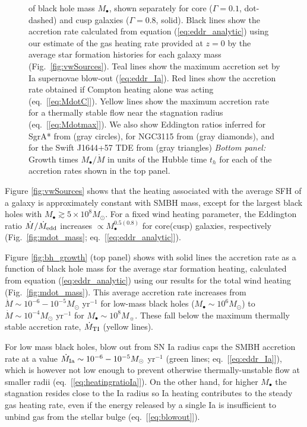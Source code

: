 \documentclass[usenatbib,fleqn]{mn2e}
\newcommand{\Mdot}{\dot{M}}
\newcommand{\Mbh}[1][]{M_{\bullet#1}}
\renewcommand{\th}{t_h}
\begin{document}
\begin{figure}
{  of black hole mass $M_{\bullet}$, shown separately for core
  ($\Gamma=0.1$, dot-dashed) and cusp galaxies ($\Gamma=0.8$,
  solid).  Black lines show the accretion rate calculated
  from equation (\ref{eq:eddr_analytic}) using our estimate of the gas
  heating rate provided at $z = 0$ by the average star formation
  histories for each galaxy mass (Fig.~\ref{fig:vwSources}).  Teal
  lines show the maximum accretion set by Ia supernovae blow-out
  (\ref{eq:eddr_Ia}).  Red lines show the accretion rate obtained
  if Compton heating alone was acting (eq.~[\ref{eq:MdotC}]).  Yellow
  lines show the maximum accretion rate for a thermally stable flow
  near the stagnation radius (eq.~[\ref{eq:Mdotmax}]).  We also show
  Eddington ratios inferred for SgrA* from \citet{Quataert:2004a}
  (gray circles), for NGC3115 from \citet{ShcherbakovWong+:2014a}
  (gray diamonds), and for the Swift J1644+57 TDE from
  \citet{BergerZauderer+:2012a} (gray triangles) {\it Bottom panel:}
  Growth times $\Mbh/\Mdot$ in units of the Hubble time $\th$ for each
  of the accretion rates shown in the top panel.}
\end{figure}

Figure \ref{fig:vwSources} shows that the heating associated with the
average SFH of a galaxy is approximately constant
with SMBH mass, except for the largest black holes with $M_{\bullet}
\gtrsim 5\times 10^{8}M_{\odot}$.  For a fixed wind heating parameter,
the Eddington ratio $\dot{M}/\dot{M}_{\rm edd}$ increases $\propto
M_{\bullet}^{0.5(0.8)}$ for core(cusp) galaxies, respectively
(Fig.~\ref{fig:mdot_mass}; eq.~[\ref{eq:eddr_analytic}]).

Figure \ref{fig:bh_growth} (top panel) shows with solid lines the
accretion rate as a function of black hole mass for the average star
formation heating, calculated from equation (\ref{eq:eddr_analytic})
using our results for the total wind heating
(Fig.~\ref{fig:mdot_mass}).  This average accretion rate increases
from $\dot{M} \sim 10^{-6}-10^{-5}M_{\odot}$ yr$^{-1}$ for low-mass
black holes ($M_{\bullet} \sim 10^{6}M_{\odot}$) to $\dot{M} \sim
10^{-4}M_{\odot}$ yr$^{-1}$ for $M_{\bullet} \sim 10^{8}M_{\sun}$.
These fall below the maximum thermally stable accretion rate,
$\dot{M}_{\rm TI}$ (yellow lines).


For low mass black holes, blow out from SN Ia radius caps the SMBH
accretion rate at a value $\dot{M}_{\rm Ia} \sim
10^{-6}-10^{-5}M_{\odot}$ yr$^{-1}$ (green lines;
eq.~[\ref{eq:eddr_Ia}]), which is however not low enough to prevent
otherwise thermally-unstable flow at smaller radii (eq.~[\ref{eq:heatingratioIa}]).  On the other hand, for higher
$M_{\bullet}$ the stagnation resides close to the Ia radius so Ia
heating contributes to the steady gas heating rate, even if the energy
released by a single Ia is insufficient to unbind gas from the stellar
bulge (eq.~[\ref{eq:blowout}]).
\end{document}
